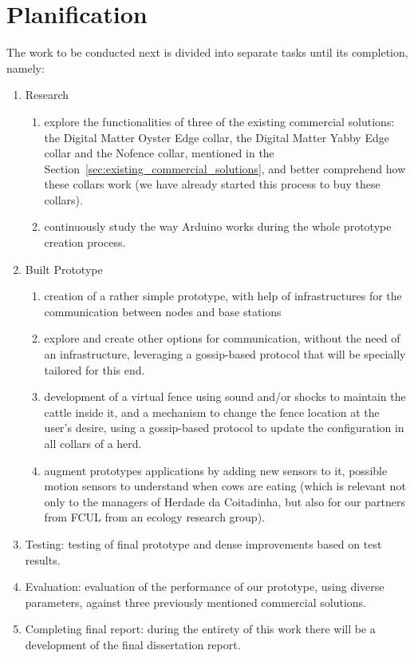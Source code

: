 \section{Planification}
\label{sec:planification}
The work to be conducted next is divided into separate tasks until its completion,
namely:
\begin{enumerate}
      \item Research
            \begin{enumerate}
                  \item explore the functionalities of three of the existing commercial solutions: the
                        Digital Matter Oyster Edge collar, the Digital Matter Yabby Edge collar and the
                        Nofence collar, mentioned in the Section~\ref{sec:existing_commercial_solutions},
                        and better comprehend how these collars work (we have already started this process
                        to buy these collars).
                  \item  continuously study the way Arduino works during the whole prototype creation
                        process.
            \end{enumerate}
      \item Built Prototype
            \begin{enumerate}
                  \item creation of a rather simple prototype, with help of infrastructures for
                        the communication between nodes and base stations
                  \item explore and create other options for communication, without the need of an
                        infrastructure, leveraging a gossip-based protocol that will be specially tailored
                        for this end.
                  \item development of a virtual fence using sound and/or shocks to maintain the
                        cattle inside it, and a mechanism to change the fence location at the user's
                        desire, using a gossip-based protocol to update the configuration in all collars
                        of a herd.
                  \item augment prototypes applications by adding new sensors to it, possible motion
                        sensors to understand when cows are eating (which is relevant not only to the managers
                        of Herdade da Coitadinha, but also for our partners from FCUL from an ecology research group).
            \end{enumerate}
      \item Testing: testing of final prototype and dense improvements based on test results.
      \item Evaluation: evaluation of the performance of our prototype, using diverse parameters,
            against three previously mentioned commercial solutions.
      \item Completing final report: during the entirety of this work there will be a development
            of the final dissertation report.
\end{enumerate}

